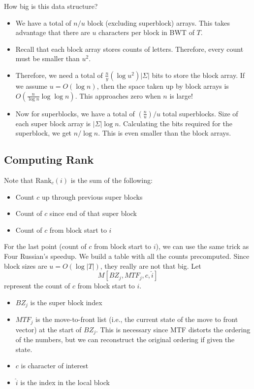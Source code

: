 \documentclass[10pt]{article}
\begin{document}
How big is this data structure?
\begin{itemize}
	\item We have a total of $n / u$ block (excluding superblock) arrays.  This takes advantage that there are $u$ characters per block in BWT of $T$.
	\item Recall that each block array stores counts of letters.  Therefore, every count must be smaller than $u^2$.  
	\item Therefore, we need a total of $\frac{n}{y} \left(\log u^2\right) |\Sigma|$ bits to store the block array.  If we assume $u = O(\log n)$, then the space taken up by block arrays is $O(\frac{n}{\log n} \log \log n)$.  This approaches zero when $n$ is large!
	\item Now for superblocks, we have a total of $(\frac{n}{u}) / u$ total superblocks.  Size of each super block array is $|\Sigma| \log n$.  Calculating the bits required for the superblock, we get $n / \log n$.  This is even smaller than the block arrays.
\end{itemize}

\subsection*{Computing Rank}
Note that $\text{Rank}_c(i)$ is the sum of the following:
\begin{itemize}
	\item Count $c$ up through previous super blocks
	\item Count of $c$ since end of that super block
	\item Count of $c$ from block start to $i$
\end{itemize}
For the last point (count of $c$ from block start to $i$), we can use the same trick as Four Russian's speedup.  We build a table with all the counts precomputed.  Since block sizes are $u = O(\log |T|)$, they really are not that big.  Let
\[M[BZ_j, MTF_j, c, \hat{i}]\]
represent the count of $c$ from block start to $i$.
\begin{itemize}
	\item $BZ_j$ is the super block index
	\item $MTF_j$ is the move-to-front list (i.e., the current state of the move to front vector) at the start of $BZ_j$.  This is necessary since MTF distorts the ordering of the numbers, but we can reconstruct the original ordering if given the state.
	\item $c$ is character of interest
	\item $\hat{i}$ is the index in the local block
\end{itemize}
\end{document}
